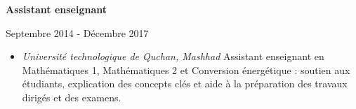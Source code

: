 \documentclass[a4paper]{letter}
\newcommand{\divider}{\rule{\linewidth}{0.9pt}}
\begin{document}
\begin{minipage}[t]{0.67\textwidth}
\vspace{3mm}

{ \textbf{Assistant enseignant}}

{ \footnotesize Septembre 2014 - Décembre 2017}
\begin{itemize}
    \footnotesize \item \textit{Université technologique de Quchan, Mashhad}
    \newline
    Assistant enseignant en Mathématiques 1, Mathématiques 2 et Conversion énergétique : soutien aux étudiants, explication des concepts clés et aide à la préparation des travaux dirigés et des examens.
\end{itemize}


\vspace{3mm}

\end{minipage}
\end{document}

